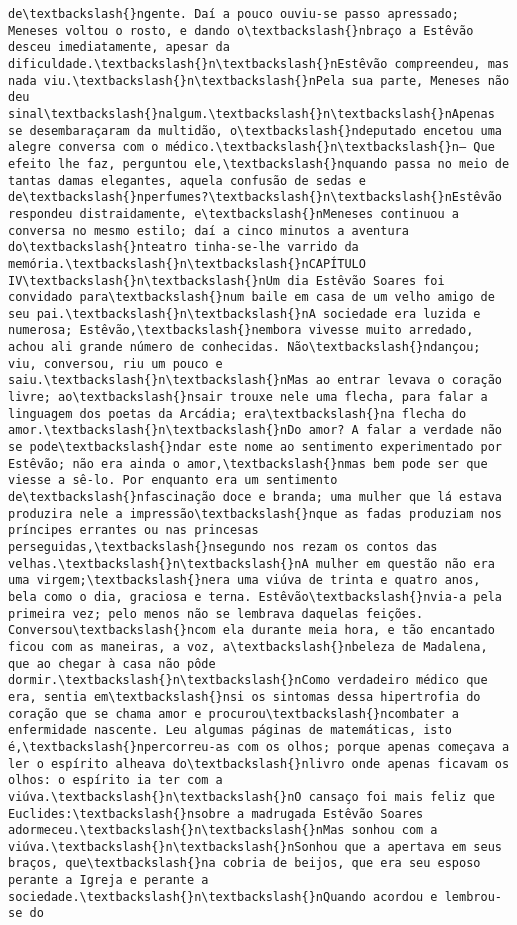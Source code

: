 \documentclass[11pt]{article}
\begin{document}
\begin{Verbatim}[commandchars=\\\{\}]
de\textbackslash{}ngente. Daí a pouco ouviu-se passo apressado; Meneses voltou o rosto, e dando o\textbackslash{}nbraço a Estêvão desceu imediatamente, apesar da dificuldade.\textbackslash{}n\textbackslash{}nEstêvão compreendeu, mas nada viu.\textbackslash{}n\textbackslash{}nPela sua parte, Meneses não deu sinal\textbackslash{}nalgum.\textbackslash{}n\textbackslash{}nApenas se desembaraçaram da multidão, o\textbackslash{}ndeputado encetou uma alegre conversa com o médico.\textbackslash{}n\textbackslash{}n— Que efeito lhe faz, perguntou ele,\textbackslash{}nquando passa no meio de tantas damas elegantes, aquela confusão de sedas e de\textbackslash{}nperfumes?\textbackslash{}n\textbackslash{}nEstêvão respondeu distraidamente, e\textbackslash{}nMeneses continuou a conversa no mesmo estilo; daí a cinco minutos a aventura do\textbackslash{}nteatro tinha-se-lhe varrido da memória.\textbackslash{}n\textbackslash{}nCAPÍTULO IV\textbackslash{}n\textbackslash{}nUm dia Estêvão Soares foi convidado para\textbackslash{}num baile em casa de um velho amigo de seu pai.\textbackslash{}n\textbackslash{}nA sociedade era luzida e numerosa; Estêvão,\textbackslash{}nembora vivesse muito arredado, achou ali grande número de conhecidas. Não\textbackslash{}ndançou; viu, conversou, riu um pouco e saiu.\textbackslash{}n\textbackslash{}nMas ao entrar levava o coração livre; ao\textbackslash{}nsair trouxe nele uma flecha, para falar a linguagem dos poetas da Arcádia; era\textbackslash{}na flecha do amor.\textbackslash{}n\textbackslash{}nDo amor? A falar a verdade não se pode\textbackslash{}ndar este nome ao sentimento experimentado por Estêvão; não era ainda o amor,\textbackslash{}nmas bem pode ser que viesse a sê-lo. Por enquanto era um sentimento de\textbackslash{}nfascinação doce e branda; uma mulher que lá estava produzira nele a impressão\textbackslash{}nque as fadas produziam nos príncipes errantes ou nas princesas perseguidas,\textbackslash{}nsegundo nos rezam os contos das velhas.\textbackslash{}n\textbackslash{}nA mulher em questão não era uma virgem;\textbackslash{}nera uma viúva de trinta e quatro anos, bela como o dia, graciosa e terna. Estêvão\textbackslash{}nvia-a pela primeira vez; pelo menos não se lembrava daquelas feições. Conversou\textbackslash{}ncom ela durante meia hora, e tão encantado ficou com as maneiras, a voz, a\textbackslash{}nbeleza de Madalena, que ao chegar à casa não pôde dormir.\textbackslash{}n\textbackslash{}nComo verdadeiro médico que era, sentia em\textbackslash{}nsi os sintomas dessa hipertrofia do coração que se chama amor e procurou\textbackslash{}ncombater a enfermidade nascente. Leu algumas páginas de matemáticas, isto é,\textbackslash{}npercorreu-as com os olhos; porque apenas começava a ler o espírito alheava do\textbackslash{}nlivro onde apenas ficavam os olhos: o espírito ia ter com a viúva.\textbackslash{}n\textbackslash{}nO cansaço foi mais feliz que Euclides:\textbackslash{}nsobre a madrugada Estêvão Soares adormeceu.\textbackslash{}n\textbackslash{}nMas sonhou com a viúva.\textbackslash{}n\textbackslash{}nSonhou que a apertava em seus braços, que\textbackslash{}na cobria de beijos, que era seu esposo perante a Igreja e perante a sociedade.\textbackslash{}n\textbackslash{}nQuando acordou e lembrou-se do 
\end{Verbatim}
\end{document}
